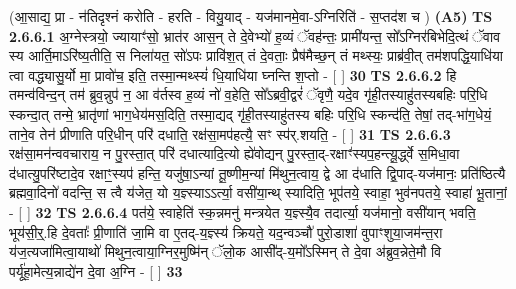 \documentclass[17pt]{extarticle}
\begin{document}
                      (आ॒साद्य॒ प्रा - न॑तिदृश्नं करोति - हरति - वियु॒याद् - यज॑मानमे॒वा-ऽग्निरिति॑ - स॒प्तद॑श च )  \textbf{(A5)} \newline \newline
                                        \textbf{ TS 2.6.6.1} \newline
                  अ॒ग्नेस्त्रयो॒ ज्यायाꣳ॑सो॒ भ्रात॑र आस॒न् ते दे॒वेभ्यो॑ ह॒व्यं ॅवह॑न्तः॒ प्रामी॑यन्त॒ सो᳚ऽग्निर॑बिभेदि॒त्थं ॅवाव स्य आर्ति॒माऽरि॑ष्य॒तीति॒ स निला॑यत॒ सो॑ऽपः प्रावि॑श॒त् तं दे॒वताः॒ प्रैष॑मैच्छ॒न् तं मथ्स्यः॒ प्राब्र॑वी॒त् तम॑शपद्धि॒याधि॑या त्वा वद्ध्यासु॒र्यो मा॒ प्रावो॑च॒ इति॒ तस्मा॒न्मथ्स्यं॑ धि॒याधि॑या घ्नन्ति श॒प्तो - [  ] \textbf{  30} \newline
                  \newline
                                \textbf{ TS 2.6.6.2} \newline
                  हि तमन्व॑विन्द॒न् तम॑ ब्रुव॒न्नुप॑ न॒ आ व॑र्तस्व ह॒व्यं नो॑ व॒हेति॒ सो᳚ऽब्रवी॒द्वरं॑ ॅवृणै॒ यदे॒व गृ॑ही॒तस्याहु॑तस्यबहिः परि॒धि स्कन्दा॒त् तन्मे॒ भ्रातृ॑णां भाग॒धेय॑मस॒दिति॒ तस्मा॒द्यद् गृ॑ही॒तस्याहु॑तस्य बहिः परि॒धि स्कन्द॑ति॒ तेषां॒ तद्-भा॑ग॒धेयं॒ ताने॒व तेन॑ प्रीणाति परि॒धीन् परि॑ दधाति॒ रक्ष॑सा॒मप॑हत्यै॒ सꣳ स्प॑र्.शयति॒ - [  ] \textbf{  31} \newline
                  \newline
                                \textbf{ TS 2.6.6.3} \newline
                  रक्ष॑सा॒मन॑न्ववचाराय॒ न पु॒रस्ता॒त् परि॑ दधात्यादि॒त्यो ह्ये॑वोद्यन् पु॒रस्ता॒द्-रक्षाꣳ॑स्यप॒हन्त्यू॒र्द्ध्वे स॒मिधा॒वा द॑धात्यु॒परि॑ष्टादे॒व रक्षाꣳ॒॒स्यप॑ हन्ति॒ यजु॑षा॒ऽन्यां तू॒ष्णीम॒न्यां मि॑थुन॒त्वाय॒ द्वे आ द॑धाति द्वि॒पाद्-यज॑मानः॒ प्रति॑ष्ठित्यै ब्रह्मवा॒दिनो॑ वदन्ति॒ स त्वै य॑जेत॒ यो य॒ज्ञ्स्याऽऽर्त्या॒ वसी॑या॒न्थ् स्यादिति॒ भूप॑तये॒ स्वाहा॒ भुव॑नपतये॒ स्वाहा॑ भू॒तानां॒ - [  ] \textbf{  32} \newline
                  \newline
                                \textbf{ TS 2.6.6.4} \newline
                  पत॑ये॒ स्वाहेति॑ स्क॒न्नमनु॑ मन्त्रयेत य॒ज्ञ्स्यै॒व तदार्त्या॒ यज॑मानो॒ वसी॑यान् भवति॒ भूय॑सी॒र्॒.हि दे॒वताः᳚ प्री॒णाति॑ जा॒मि वा ए॒तद्-य॒ज्ञ्स्य॑ क्रियते॒ यद॒न्वञ्चौ॑ पुरो॒डाशा॑ वुपाꣳशुया॒जम॑न्त॒रा य॑ज॒त्यजा॑मित्वा॒याथो॑ मिथुन॒त्वाया॒ग्निर॒मुष्मि॑न् ॅलो॒क आसी᳚द्-य॒मो᳚ऽस्मिन् ते दे॒वा अ॑ब्रुव॒न्नेते॒मौ वि पर्यू॑हा॒मेत्य॒न्नाद्ये॑न दे॒वा अ॒ग्नि - [  ] \textbf{  33} \newline
                  \newline
\end{document}

